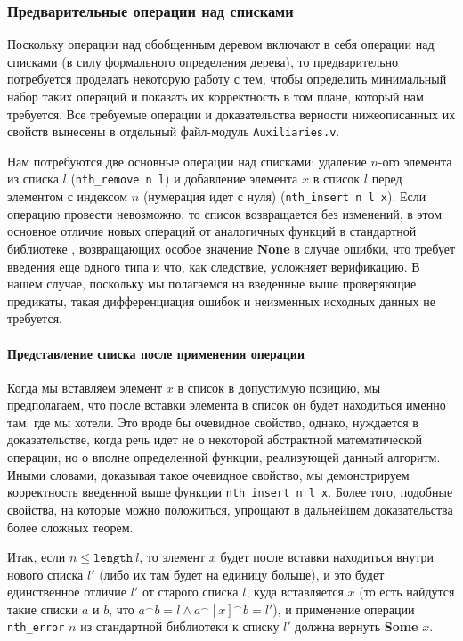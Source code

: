 \subsubsection{Предварительные операции над списками}

Поскольку операции над обобщенным деревом включают в себя операции над списками (в силу формального определения дерева), то предварительно потребуется проделать некоторую работу с тем, чтобы определить минимальный набор таких операций и показать их корректность в том плане, который нам требуется. Все требуемые операции и доказательства верности нижеописанных их свойств вынесены в отдельный файл-модуль \texttt{Auxiliaries.v}.

Нам потребуются две основные операции над списками: удаление $n$-ого элемента из списка $l$ (\texttt{nth\_remove n l}) и добавление элемента $x$ в список $l$ перед элементом с индексом $n$ (нумерация идет с нуля) (\texttt{nth\_insert n l x}). Если операцию провести невозможно, то список возвращается без изменений, в этом основное отличие новых операций от аналогичных функций в стандартной библиотеке \tcoq, возвращающих особое значение \textbf{None} в случае ошибки, что требует введения еще одного типа и что, как следствие, усложняет верификацию. В нашем случае, поскольку мы полагаемся на введенные выше проверяющие предикаты, такая дифференциация ошибок и неизменных исходных данных не требуется.

\paragraph{Представление списка после применения операции} Когда мы вставляем элемент $x$ в список в допустимую позицию, мы предполагаем, что после вставки элемента в список он будет находиться именно там, где мы хотели. Это вроде бы очевидное свойство, однако, нуждается в доказательстве, когда речь идет не о некоторой абстрактной математической операции, но о вполне определенной функции, реализующей данный алгоритм. Иными словами, доказывая такое очевидное свойство, мы демонстрируем корректность введенной выше функции \texttt{nth\_insert n l x}. Более того, подобные свойства, на которые можно положиться, упрощают в дальнейшем доказательства более сложных теорем.

Итак, если $n \leq \texttt{length}\ l$, то элемент $x$ будет после вставки находиться внутри нового списка $l'$ (либо их там будет на единицу больше), и это будет единственное отличие $l'$ от старого списка $l$, куда вставляется $x$ (то есть найдутся такие списки $a$ и $b$, что $a^\frown  b = l \wedge a^\frown [x]^\frown b = l'$),  и применение операции \texttt{nth\_error} $n$ из стандартной библиотеки к списку $l'$ должна вернуть \textbf{Some} $x$.

